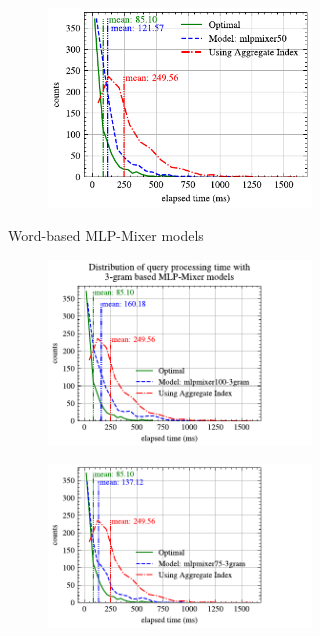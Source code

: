 \documentclass[conference]{IEEEtran}
\begin{document}
\begin{figure}[!h]
\begin{subfigure}{0.45\textwidth}
\begin{subfigure}{\textwidth}
			\includegraphics[]{graphics/perf_dist_mlpmixer50_A.pdf}
		\end{subfigure}
		\caption{Word-based MLP-Mixer models}
	\end{subfigure}
	\hfill
	\begin{subfigure}{0.45\textwidth}
		\begin{subfigure}{\textwidth}
			\centering
			\includegraphics[]{graphics/perf_dist_mlpmixer100_3gram_A.pdf}
		\end{subfigure}
		\vfill
		\begin{subfigure}{\textwidth}
			\centering
			\includegraphics[]{graphics/perf_dist_mlpmixer75_3gram_A.pdf}

\end{subfigure}
\end{subfigure}
\end{figure}
\end{document}
